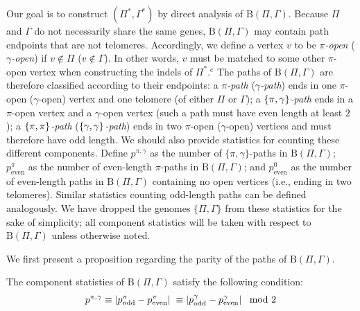 Our goal is to construct $(\Pi^*, \Gamma^*)$ by direct analysis of $\mathrm{B}(\Pi, \Gamma)$.  Because $\Pi$ and $\Gamma$ do not necessarily share the same genes, $\mathrm{B}(\Pi, \Gamma)$ may contain path endpoints that are not telomeres.  Accordingly, we define a vertex $v$ to be ${\mathit \pi}${\em -open} (${\mathit \gamma}${\em-open}) if $v \notin \Pi$ ($v \notin \Gamma$).  In other words, $v$ must be matched to some other $\pi$-open vertex when constructing the indels of $\Pi^*$.$^\textrm{c}$ The paths of $\mathrm{B}(\Pi, \Gamma)$ are therefore classified according to their endpoints: a {\em ${\mathit \pi}$-path} ({\em ${\mathit \gamma}$-path}) ends in one $\pi$-open ($\gamma$-open) vertex and one telomere (of either $\Pi$ or $\Gamma$); a ${\mathit \{\pi, \gamma\}}${\em-path} ends in a $\pi$-open vertex and a $\gamma$-open vertex (such a path must have even length at least $2$); a ${\mathit \{\pi, \pi\}}${\em-path} (${\mathit \{\gamma, \gamma\}}${\em-path}) ends in two $\pi$-open ($\gamma$-open) vertices and must therefore have odd length.  We should also provide statistics for counting these different components.  Define $p^{\pi, \gamma}$ as the number of $\{\pi, \gamma\}$-paths in $\mathrm{B}(\Pi, \Gamma)$;  $p^{\pi}_{\mathrm{even}}$ as the number of even-length $\pi$-paths in $\mathrm{B}(\Pi, \Gamma)$; and $p^{0}_{\mathrm{even}}$ as the number of even-length paths in $\mathrm{B}(\Pi, \Gamma)$ containing no open vertices (i.e., ending in two telomeres).  Similar statistics counting odd-length paths can be defined analogously.  We have dropped the genomes $\{\Pi, \Gamma\}$ from these statistics for the sake of simplicity; all component statistics will be taken with respect to $\mathrm{B}(\Pi, \Gamma)$ unless otherwise noted.

We first present a proposition regarding the parity of the paths of $\mathrm{B}(\Pi, \Gamma)$.

\begin{proposition}
The component statistics of $\mathrm{B}(\Pi, \Gamma)$ satisfy the following condition:
\begin{align}
p^{\pi, \gamma} \equiv \left| p^{\pi}_{\mathrm{odd}} - p^{\pi}_{\mathrm{even}} \right| \hspace{2.9 pt}  \equiv \left| p^{\gamma}_{\mathrm{odd}} - p^{\gamma}_{\mathrm{even}} \right|  \mod 2 \label{Equation: Modulo 1}
\end{align}
\label{Proposition: Parity Proposition}
\end{proposition}

